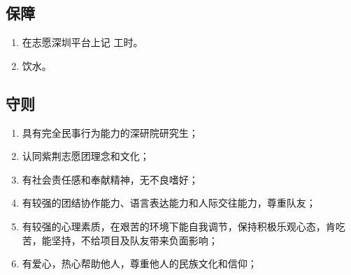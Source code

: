 \documentclass[12pt]{ctexart}
\begin{document}
\begin{appendix}
\subsection{保障}
\begin{enumerate}
\item 在志愿深圳平台上记 工时。
\item 饮水。
\end{enumerate}
\subsection{守则}
\begin{enumerate}[label = {(\chinese*)}]
\item 具有完全民事行为能力的深研院研究生；
\item 认同紫荆志愿团理念和文化；
\item 有社会责任感和奉献精神，无不良嗜好；
\item 有较强的团结协作能力、语言表达能力和人际交往能力，尊重队友；
\item 有较强的心理素质，在艰苦的环境下能自我调节，保持积极乐观心态，肯吃苦，能坚持，不给项目及队友带来负面影响； 
\item 有爱心，热心帮助他人，尊重他人的民族文化和信仰；
\end{enumerate}
\end{appendix}
\end{document}
